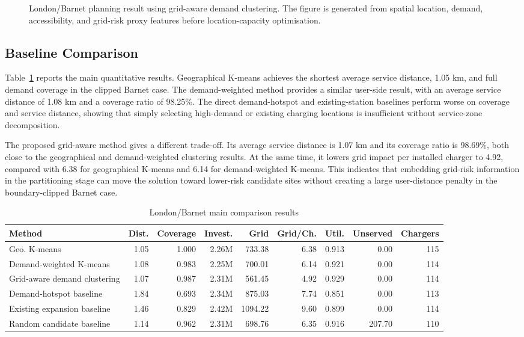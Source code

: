 \begin{figure}[!t]
\centering

\caption{London/Barnet planning result using grid-aware demand clustering. The figure is generated from spatial location, demand, accessibility, and grid-risk proxy features before location-capacity optimisation.}
\label{fig:london_grid}
\end{figure}

\subsection{Baseline Comparison}
Table~\ref{tab:london_results} reports the main quantitative results. Geographical K-means achieves the shortest average service distance, 1.05 km, and full demand coverage in the clipped Barnet case. The demand-weighted method provides a similar user-side result, with an average service distance of 1.08 km and a coverage ratio of 98.25\%. The direct demand-hotspot and existing-station baselines perform worse on coverage and service distance, showing that simply selecting high-demand or existing charging locations is insufficient without service-zone decomposition.

The proposed grid-aware method gives a different trade-off. Its average service distance is 1.07 km and its coverage ratio is 98.69\%, both close to the geographical and demand-weighted clustering results. At the same time, it lowers grid impact per installed charger to 4.92, compared with 6.38 for geographical K-means and 6.14 for demand-weighted K-means. This indicates that embedding grid-risk information in the partitioning stage can move the solution toward lower-risk candidate sites without creating a large user-distance penalty in the boundary-clipped Barnet case.

\begin{table}[!t]
\centering
\caption{London/Barnet main comparison results}
\label{tab:london_results}
\begin{tabular}{lrrrrrrrr}
\toprule
Method & Dist. & Coverage & Invest. & Grid & Grid/Ch. & Util. & Unserved & Chargers \\
\midrule
Geo. K-means & 1.05 & 1.000 & 2.26M & 733.38 & 6.38 & 0.913 & 0.00 & 115 \\
Demand-weighted K-means & 1.08 & 0.983 & 2.25M & 700.01 & 6.14 & 0.921 & 0.00 & 114 \\
Grid-aware demand clustering & 1.07 & 0.987 & 2.31M & 561.45 & 4.92 & 0.929 & 0.00 & 114 \\
Demand-hotspot baseline & 1.84 & 0.693 & 2.34M & 875.03 & 7.74 & 0.851 & 0.00 & 113 \\
Existing expansion baseline & 1.46 & 0.829 & 2.42M & 1094.22 & 9.60 & 0.899 & 0.00 & 114 \\
Random candidate baseline & 1.14 & 0.962 & 2.31M & 698.76 & 6.35 & 0.916 & 207.70 & 110 \\
\bottomrule
\end{tabular}
\end{table}

